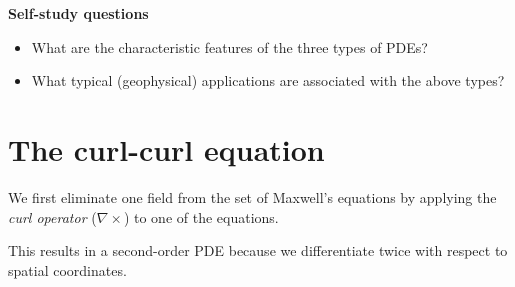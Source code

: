 \documentclass[
  a4paper,
  DIV=11,
  numbers=noendperiod]{scrreprt}
\providecommand{\tightlist}{%
  \setlength{\itemsep}{0pt}\setlength{\parskip}{0pt}}\usepackage{longtable,booktabs,array}
\begin{document}
\begin{tcolorbox}[enhanced jigsaw, breakable, bottomrule=.15mm, arc=.35mm, colback=white, opacityback=0, leftrule=.75mm, colframe=quarto-callout-note-color-frame, rightrule=.15mm, left=2mm, toprule=.15mm]

\vspace{-3mm}\textbf{Self-study questions}\vspace{3mm}

\begin{itemize}
\tightlist
\item
  What are the characteristic features of the three types of PDEs?
\item
  What typical (geophysical) applications are associated with the above
  types?
\end{itemize}

\end{tcolorbox}

\section{The curl-curl equation}\label{the-curl-curl-equation}

We first eliminate one field from the set of Maxwell's equations by
applying the \emph{curl operator} (\(\nabla \times\)) to one of the
equations.

This results in a second-order PDE because we differentiate twice with
respect to spatial coordinates.
\end{document}
